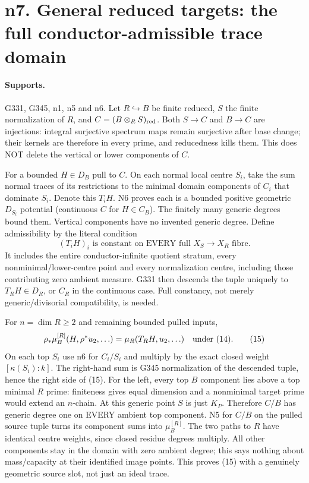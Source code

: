 \documentclass[11pt]{article}
\begin{document}
\section{n7. General reduced targets: the full conductor-admissible trace domain}
\paragraph{Supports.} G331, G345, n1, n5 and n6.
Let $R\hookrightarrow B$ be finite reduced, $S$ the finite normalization of $R$, and $C=(B\otimes_RS)_{\rm red}$. Both $S\to C$ and $B\to C$ are injections: integral surjective spectrum maps remain surjective after base change; their kernels are therefore in every prime, and reducedness kills them. This does NOT delete the vertical or lower components of $C$.

For a bounded $H\in D_B$ pull to $C$. On each normal local centre $S_i$, take the sum normal traces of its restrictions to the minimal domain components of $C_i$ that dominate $S_i$. Denote this $T_iH$. N6 proves each is a bounded positive geometric $D_{S_i}$ potential (continuous $C$ for $H\in C_B$). The finitely many generic degrees bound them. Vertical components have no invented generic degree. Define admissibility by the literal condition
\[
 (T_iH)_i\text{ is constant on EVERY full }X_S\to X_R\text{ fibre}. \tag{14}
\]
It includes the entire conductor-infinite quotient stratum, every nonminimal/lower-centre point and every normalization centre, including those contributing zero ambient measure. G331 then descends the tuple uniquely to $T_RH\in D_R$, or $C_R$ in the continuous case. Full constancy, not merely generic/divisorial compatibility, is needed.

For $n=\dim R\ge2$ and remaining bounded pulled inputs,
\[
 \rho_*\mu_B^{[R]}(H,\rho^*u_2,\ldots)
 =\mu_R(T_RH,u_2,\ldots)\quad\hbox{under (14)}. \tag{15}
\]
On each top $S_i$ use n6 for $C_i/S_i$ and multiply by the exact closed weight $[\kappa(S_i):k]$. The right-hand sum is G345 normalization of the descended tuple, hence the right side of (15). For the left, every top $B$ component lies above a top minimal $R$ prime: finiteness gives equal dimension and a nonminimal target prime would extend an $n$-chain. At this generic point $S$ is just $K_P$. Therefore $C/B$ has generic degree one on EVERY ambient top component. N5 for $C/B$ on the pulled source tuple turns its component sums into $\mu_B^{[R]}$. The two paths to $R$ have identical centre weights, since closed residue degrees multiply. All other components stay in the domain with zero ambient degree; this says nothing about mass/capacity at their identified image points. This proves (15) with a genuinely geometric source slot, not just an ideal trace.
\end{document}
